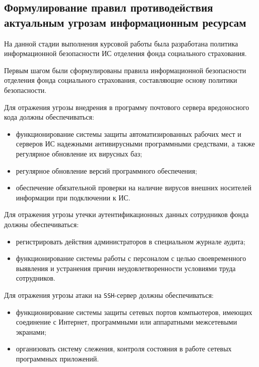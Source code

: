 \subsection{Формулирование правил противодействия
  актуальным угрозам информационным ресурсам}

\point На данной стадии выполнения курсовой работы была разработана
политика информационной безопасности ИС отделения фонда социального
страхования.

Первым шагом были сформулированы правила информационной безопасности
отделения фонда социального страхования, составляющие основу политики безопасности.

\point Для отражения угрозы внедрения в программу почтового сервера
вредоносного кода должны обеспечиваться:

\begin{itemize}
\item функционирование системы защиты автоматизированных рабочих мест
  и серверов ИС надежными антивирусными программными средствами, а
  также регулярное обновление их вирусных баз;
\item регулярное обновление версий программного обеспечения;
\item обеспечение обязательной проверки на наличие вирусов внешних
  носителей информации при подключении к ИС.
\end{itemize}

\point Для отражения угрозы утечки аутентификационных данных
сотрудников фонда должны обеспечиваться:

\begin{itemize}
\item регистрировать действия администраторов в специальном журнале
  аудита;
\item функционирование системы работы с персоналом с целью
  своевременного выявления и устранения причин неудовлетворенности
  условиями труда сотрудников.
\end{itemize}

\point Для отражения угрозы атаки на \texttt{SSH}-сервер должны
обеспечиваться:

\begin{itemize}
\item функционирование системы защиты сетевых портов компьютеров,
  имеющих соединение с Интернет, программными или аппаратными
  межсетевыми экранами;
\item организовать систему слежения, контроля состояния в работе
  сетевых программных приложений.
\end{itemize}

